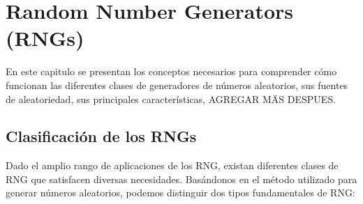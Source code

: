 \chapter{Random Number Generators (RNGs)}

    En este capitulo se presentan los conceptos necesarios para comprender cómo funcionan las diferentes clases de generadores de números aleatorios, sus fuentes de aleatoriedad, sus principales características, AGREGAR MÄS DESPUES. 

    \section{Clasificación de los RNGs}

        Dado el amplio rango de aplicaciones de los RNG, existan diferentes clases de RNG que satisfacen diversas necesidades. Basándonos en el método utilizado para generar números aleatorios, podemos distinguir dos tipos fundamentales de RNG:
	        
